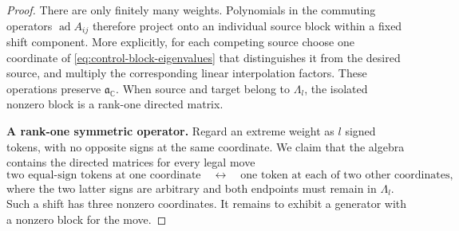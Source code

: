 \begin{proof}
There are only finitely many weights.  Polynomials in the commuting
operators \(\operatorname{ad}A_{ij}\) therefore project onto an
individual source block within a fixed shift component.  More
explicitly, for each competing source choose one coordinate of
\eqref{eq:control-block-eigenvalues} that distinguishes it from the
desired source, and multiply the corresponding linear interpolation
factors.  These operations preserve \(\mathfrak a_{\mathbb C}\).
When source and target belong to \(\Lambda_l\), the isolated nonzero
block is a rank-one directed matrix.

\medskip
\noindent\textbf{A rank-one symmetric operator.}
Regard an extreme weight as \(l\) signed tokens, with no opposite
signs at the same coordinate.  We claim that the algebra contains
the directed matrices for every legal move
\[
 \text{two equal-sign tokens at one coordinate}
 \quad\longleftrightarrow\quad
 \text{one token at each of two other coordinates},
\]
where the two latter signs are arbitrary and both endpoints must
remain in \(\Lambda_l\).  Such a shift has three nonzero coordinates.
It remains to exhibit a generator with a nonzero block for the move.


\end{proof}
